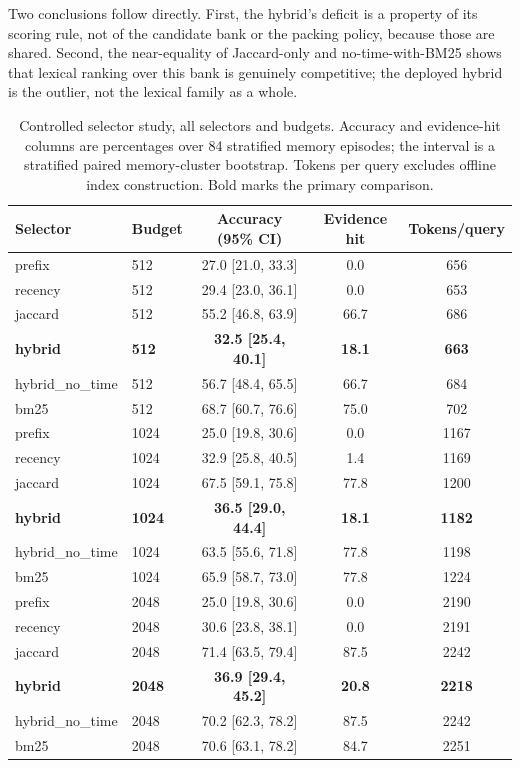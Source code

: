 Two conclusions follow directly. First, the hybrid's deficit is a property of its
scoring rule, not of the candidate bank or the packing policy, because those are
shared. Second, the near-equality of Jaccard-only and no-time-with-BM25 shows that
lexical ranking over this bank is genuinely competitive; the deployed hybrid is the
outlier, not the lexical family as a whole.

\begin{table}[htbp]
\centering
\small
\caption{Controlled selector study, all selectors and budgets. Accuracy and evidence-hit
columns are percentages over 84 stratified memory episodes; the interval is a stratified
paired memory-cluster bootstrap. Tokens per query excludes offline index construction.
Bold marks the primary comparison.}
\label{tab:controlled_main}
\begin{tabular}{llccc}
\toprule
Selector & Budget & Accuracy (95\% CI) & Evidence hit & Tokens/query \\
\midrule
prefix    & 512  & 27.0 [21.0, 33.3] & 0.0 & 656 \\
recency   & 512  & 29.4 [23.0, 36.1] & 0.0 & 653 \\
jaccard   & 512  & 55.2 [46.8, 63.9] & 66.7 & 686 \\
\textbf{hybrid} & \textbf{512} & \textbf{32.5 [25.4, 40.1]} & \textbf{18.1} & \textbf{663} \\
hybrid\_no\_time & 512 & 56.7 [48.4, 65.5] & 66.7 & 684 \\
bm25      & 512  & 68.7 [60.7, 76.6] & 75.0 & 702 \\
\midrule
prefix    & 1024 & 25.0 [19.8, 30.6] & 0.0 & 1167 \\
recency   & 1024 & 32.9 [25.8, 40.5] & 1.4 & 1169 \\
jaccard   & 1024 & 67.5 [59.1, 75.8] & 77.8 & 1200 \\
\textbf{hybrid} & \textbf{1024} & \textbf{36.5 [29.0, 44.4]} & \textbf{18.1} & \textbf{1182} \\
hybrid\_no\_time & 1024 & 63.5 [55.6, 71.8] & 77.8 & 1198 \\
bm25      & 1024 & 65.9 [58.7, 73.0] & 77.8 & 1224 \\
\midrule
prefix    & 2048 & 25.0 [19.8, 30.6] & 0.0 & 2190 \\
recency   & 2048 & 30.6 [23.8, 38.1] & 0.0 & 2191 \\
jaccard   & 2048 & 71.4 [63.5, 79.4] & 87.5 & 2242 \\
\textbf{hybrid} & \textbf{2048} & \textbf{36.9 [29.4, 45.2]} & \textbf{20.8} & \textbf{2218} \\
hybrid\_no\_time & 2048 & 70.2 [62.3, 78.2] & 87.5 & 2242 \\
bm25      & 2048 & 70.6 [63.1, 78.2] & 84.7 & 2251 \\
\bottomrule
\end{tabular}
\end{table}

